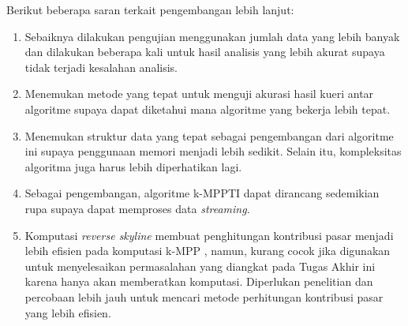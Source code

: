 \tab Berikut beberapa saran terkait pengembangan lebih lanjut:

\begin{enumerate}
	\item Sebaiknya dilakukan pengujian menggunakan jumlah data yang lebih banyak dan dilakukan beberapa kali untuk hasil analisis yang lebih akurat supaya tidak terjadi kesalahan analisis.
	\item Menemukan metode yang tepat untuk menguji akurasi hasil kueri antar algoritme supaya dapat diketahui mana algoritme yang bekerja lebih tepat.
	\item Menemukan struktur data yang tepat sebagai pengembangan dari algoritme ini supaya penggunaan memori menjadi lebih sedikit. Selain itu, kompleksitas algoritma juga harus lebih diperhatikan lagi.
	\item Sebagai pengembangan, algoritme k-MPPTI dapat dirancang sedemikian rupa supaya dapat memproses data \textit{streaming}.
	\pagebreak
	\item Komputasi \textit{reverse skyline} membuat penghitungan kontribusi pasar menjadi lebih efisien pada komputasi k-MPP \cite{kmpp}, namun, kurang cocok jika digunakan untuk menyelesaikan permasalahan yang diangkat pada Tugas Akhir ini karena hanya akan memberatkan komputasi. Diperlukan penelitian dan percobaan lebih jauh untuk mencari metode perhitungan kontribusi pasar yang lebih efisien.
\end{enumerate}



